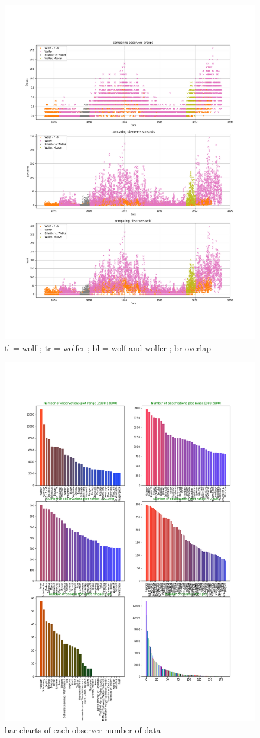 \documentclass[12pt]{article}
\begin{document}
\begin{figure}[H]
    \includegraphics[width=0.5\linewidth]{wolf_and_wolfer_overlap.png}
    \caption{tl = wolf ; tr = wolfer ; bl = wolf and wolfer ; br overlap}
    \label{fig:wolf and wolfer initial plots}
\end{figure}

\begin{figure}[H]
    \includegraphics[width=\linewidth]{histogram_number_data.png}
    \caption{bar charts of each observer number of data}
    \label{fig:bar chart number data}
\end{figure}
\end{document}
